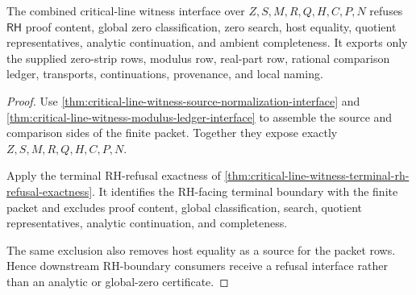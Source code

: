 \begin{theorem}
\label{thm:critical-line-witness-rh-refusal-interface}
The combined critical-line witness interface over $Z,S,M,R,Q,H,C,P,N$ refuses $\mathsf{RH}$ proof content, global zero classification, zero search, host equality, quotient representatives, analytic continuation, and ambient completeness. It exports only the supplied zero-strip rows, modulus row, real-part row, rational comparison ledger, transports, continuations, provenance, and local naming.
\end{theorem}
\begin{proof}
Use \autoref{thm:critical-line-witness-source-normalization-interface} and \autoref{thm:critical-line-witness-modulus-ledger-interface} to assemble the source and comparison sides of the finite packet. Together they expose exactly $Z,S,M,R,Q,H,C,P,N$.

Apply the terminal RH-refusal exactness of \autoref{thm:critical-line-witness-terminal-rh-refusal-exactness}. It identifies the RH-facing terminal boundary with the finite packet and excludes proof content, global classification, search, quotient representatives, analytic continuation, and completeness.

The same exclusion also removes host equality as a source for the packet rows. Hence downstream RH-boundary consumers receive a refusal interface rather than an analytic or global-zero certificate.
\end{proof}

